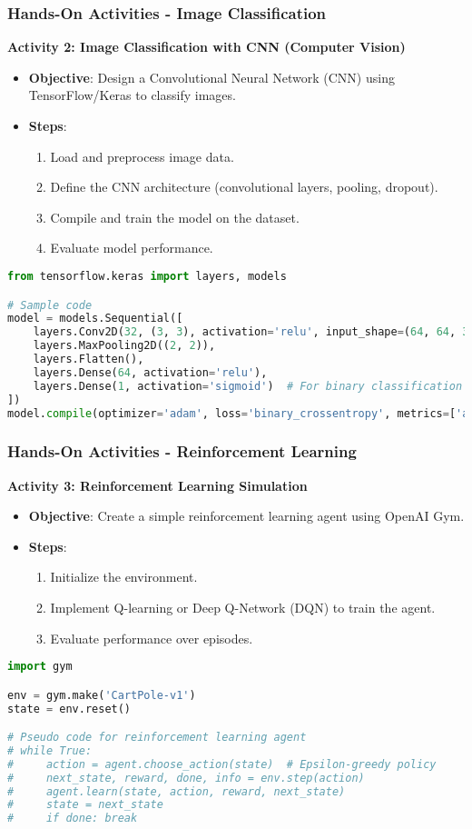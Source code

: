 \documentclass[aspectratio=169]{beamer}
\begin{document}
\begin{frame}[fragile]
  \frametitle{Hands-On Activities - Image Classification}
  \textbf{Activity 2: Image Classification with CNN (Computer Vision)}
  \begin{itemize}
    \item \textbf{Objective}: Design a Convolutional Neural Network (CNN) using TensorFlow/Keras to classify images.
    \item \textbf{Steps}:
      \begin{enumerate}
        \item Load and preprocess image data.
        \item Define the CNN architecture (convolutional layers, pooling, dropout).
        \item Compile and train the model on the dataset.
        \item Evaluate model performance.
      \end{enumerate}
  \end{itemize}

  \begin{lstlisting}[language=Python]
from tensorflow.keras import layers, models

# Sample code
model = models.Sequential([
    layers.Conv2D(32, (3, 3), activation='relu', input_shape=(64, 64, 3)),
    layers.MaxPooling2D((2, 2)),
    layers.Flatten(),
    layers.Dense(64, activation='relu'),
    layers.Dense(1, activation='sigmoid')  # For binary classification
])
model.compile(optimizer='adam', loss='binary_crossentropy', metrics=['accuracy'])
  \end{lstlisting}
\end{frame}

\begin{frame}[fragile]
  \frametitle{Hands-On Activities - Reinforcement Learning}
  \textbf{Activity 3: Reinforcement Learning Simulation}
  \begin{itemize}
    \item \textbf{Objective}: Create a simple reinforcement learning agent using OpenAI Gym.
    \item \textbf{Steps}:
      \begin{enumerate}
        \item Initialize the environment.
        \item Implement Q-learning or Deep Q-Network (DQN) to train the agent.
        \item Evaluate performance over episodes.
      \end{enumerate}
  \end{itemize}
  
  \begin{lstlisting}[language=Python]
import gym

env = gym.make('CartPole-v1')
state = env.reset()

# Pseudo code for reinforcement learning agent
# while True:
#     action = agent.choose_action(state)  # Epsilon-greedy policy
#     next_state, reward, done, info = env.step(action)
#     agent.learn(state, action, reward, next_state)
#     state = next_state
#     if done: break
  \end{lstlisting}
\end{frame}
\end{document}
